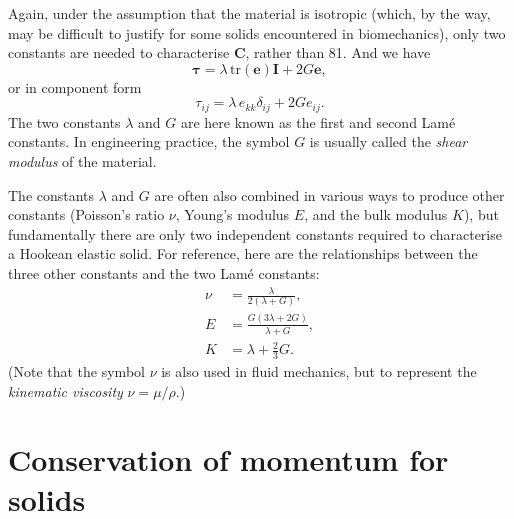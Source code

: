 \documentclass[a4paper,11pt]		{report}
\begin{document}
Again, under the assumption that the material is isotropic (which, by
the way, may be difficult to justify for some solids encountered in
biomechanics), only two constants are needed to characterise $\bm{C}$,
rather than 81. And we have
\begin{equation}
\bm{\tau}=\lambda\,\mathrm{tr}(\bm{e})\bm{I} + 2G\bm{e},
\label{eq.hookes}
\end{equation}
or in component form
\begin{equation}
\tau_{ij} = \lambda\,e_{kk}\delta_{ij} + 2Ge_{ij}.
\end{equation}
The two constants $\lambda$ and $G$ are here known as the first and
second Lam\'{e} constants. In engineering practice, the symbol $G$ is
usually called the \emph{shear modulus} of the material.

The constants $\lambda$ and $G$ are often also combined in various
ways to produce other constants (Poisson's ratio $\nu$, Young's
modulus $E$, and the bulk modulus $K$), but fundamentally there are
only two independent constants required to characterise a Hookean
elastic solid. For reference, here are the relationships between the
three other constants and the two Lam\'{e} constants:
\begin{eqnarray*}
{\nu} &=\frac{\lambda}{2(\lambda + G)},\\
E   &=\frac{G(3\lambda+2G)}{\lambda+G},\\
K   &=\lambda + \frac{2}{3} G.
\end{eqnarray*}
(Note that the symbol $\nu$ is also used in fluid mechanics, but to
represent the \emph{kinematic viscosity} $\nu=\mu/\rho$.)


\section{Conservation of momentum for solids}
\end{document}
